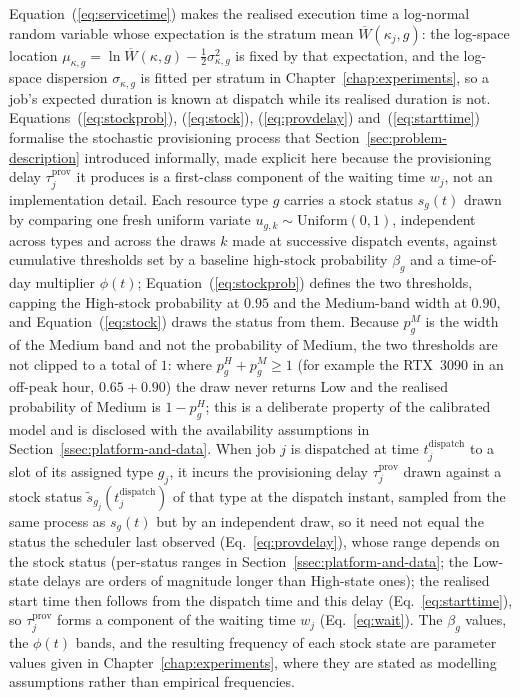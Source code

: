 Equation~(\ref{eq:servicetime}) makes the realised execution time a log-normal random variable whose expectation is the stratum mean $\overline{W}(\kappa_j,g)$: the log-space location $\mu_{\kappa,g} = \ln \overline{W}(\kappa,g) - \tfrac{1}{2}\sigma_{\kappa,g}^2$ is fixed by that expectation, and the log-space dispersion $\sigma_{\kappa,g}$ is fitted per stratum in Chapter~\ref{chap:experiments}, so a job's expected duration is known at dispatch while its realised duration is not. Equations~(\ref{eq:stockprob}), (\ref{eq:stock}), (\ref{eq:provdelay}) and~(\ref{eq:starttime}) formalise the stochastic provisioning process that Section~\ref{sec:problem-description} introduced informally, made explicit here because the provisioning delay $\tau^{\text{prov}}_j$ it produces is a first-class component of the waiting time $w_j$, not an implementation detail. Each resource type $g$ carries a stock status $s_g(t)$ drawn by comparing one fresh uniform variate $u_{g,k} \sim \text{Uniform}(0,1)$, independent across types and across the draws $k$ made at successive dispatch events, against cumulative thresholds set by a baseline high-stock probability $\beta_g$ and a time-of-day multiplier $\phi(t)$; Equation~(\ref{eq:stockprob}) defines the two thresholds, capping the High-stock probability at $0.95$ and the Medium-band width at $0.90$, and Equation~(\ref{eq:stock}) draws the status from them. Because $p^{M}_g$ is the width of the Medium band and not the probability of Medium, the two thresholds are not clipped to a total of $1$: where $p^{H}_g + p^{M}_g \ge 1$ (for example the RTX~3090 in an off-peak hour, $0.65 + 0.90$) the draw never returns Low and the realised probability of Medium is $1 - p^{H}_g$; this is a deliberate property of the calibrated model and is disclosed with the availability assumptions in Section~\ref{ssec:platform-and-data}. When job $j$ is dispatched at time $t_j^{\text{dispatch}}$ to a slot of its assigned type $g_j$, it incurs the provisioning delay $\tau^{\text{prov}}_j$ drawn against a stock status $\tilde s_{g_j}(t_j^{\text{dispatch}})$ of that type at the dispatch instant, sampled from the same process as $s_g(t)$ but by an independent draw, so it need not equal the status the scheduler last observed (Eq.~\ref{eq:provdelay}), whose range depends on the stock status (per-status ranges in Section~\ref{ssec:platform-and-data}; the Low-state delays are orders of magnitude longer than High-state ones); the realised start time then follows from the dispatch time and this delay (Eq.~\ref{eq:starttime}), so $\tau^{\text{prov}}_j$ forms a component of the waiting time $w_j$ (Eq.~\ref{eq:wait}). The $\beta_g$ values, the $\phi(t)$ bands, and the resulting frequency of each stock state are parameter values given in Chapter~\ref{chap:experiments}, where they are stated as modelling assumptions rather than empirical frequencies.

